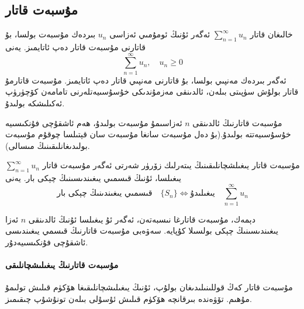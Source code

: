 \subsection{مۇسبەت قاتار}
	خالىغان قاتار 
	$\sum\limits_{n=1}^\infty u_n$
	ئەگەر ئۇنىڭ ئومۇمىي ئەزاسى $u_n$ بىردەك مۇسبەت بولسا، بۇ قاتارنى مۇسبەت قاتار دەپ ئاتايمىز. يەنى
	$$
	\sum\limits_{n=1}^\infty u_n, \quad u_n \ge 0
	$$
ئەگەر بىردەك مەنپىي بولسا، بۇ قاتارنى مەنپىي قاتار دەپ ئاتايمىز. مۇسبەت قاتارمۇ قاتار بولۇش سۈپىتى بىلەن، ئالدىنقى مەزمۇندىكى خۇسۇسىيەتلەرنى تامامەن كۆچۈرۈپ ئەكىلىشكە بولىدۇ.

مۇسبەت قاتارنىڭ ئالدىنقى $n$ ئەزاسىمۇ مۇسبەت بولىدۇ، ھەم ئاشقۇچى فۇنكىسىيە خۇسۇسىيەتتە بولىدۇ.(بۇ دەل مۇسبەت سانغا مۇسبەت سان قېتىلسا چوقۇم مۇسبەت بولىدىغانلىقىنىڭ مىسالى).

\begin{MyTheorem}{مۇسبەت قاتار يىغىلشچانلىقىنىڭ يىتەرلىك زۆرۈر شەرتى}{}%
	ئەگەر مۇسبەت قاتار
	$\sum\limits_{n=1}^\infty u_n$
	يىغىلسا، ئۇنىڭ قىسمىي يىغىندىسىنىڭ چېكى بار. يەنى
	$$
	\text{قىسمىي يىغىندىنىڭ چېكى بار} \quad \{ S_n \} 
	\Leftrightarrow 
	\text{يىغىلىدۇ} \quad \sum\limits_{n=1}^\infty u_n  
	$$
\end{MyTheorem}

دېمەك، مۇسبەت قاتارغا نىسبەتەن، ئەگەر ئۇ يىغىلسا ئۇنىڭ ئالدىنقى $n$ ئەزا يىغىندىسىنىڭ چېكى بولسىلا كۇپايە. سەۋەبى مۇسبەت قاتارنىڭ قىسمي يىغىندىسى ئاشقۇچى فۇنكىسىيەدۇر.
\paragraph{مۇسبەت قاتارنىڭ يىغىلىشچانلىقى}
مۇسبەت قاتار كەڭ قوللىنىلىدىغان بولۇپ، ئۇنىڭ يىغىلىشچانلىقىغا ھۆكۈم قىلىش تولىمۇ مۇھىم. تۆۋەندە بىرقانچە ھۆكۈم قىلىش ئۇسۇلى بىلەن تونۇشۇپ چىقىمىز.

